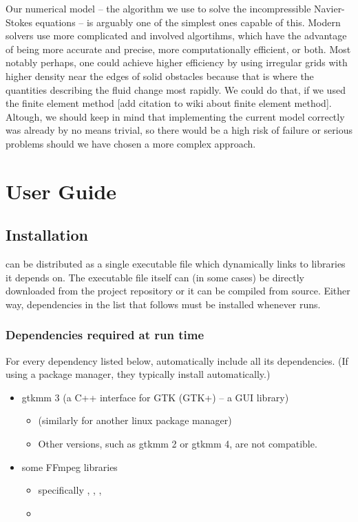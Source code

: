 \documentclass[11pt,a4paper,twoside,openright]{report}
\begin{document}
Our numerical model -- the algorithm we use to solve the incompressible Navier-Stokes equations -- is arguably one of the simplest ones capable of this. Modern solvers use more complicated and involved algortihms, which have the advantage of being more accurate and precise, more computationally efficient, or both. Most notably perhaps, one could achieve higher efficiency by using irregular grids with higher density near the edges of solid obstacles because that is where the quantities describing the fluid change most rapidly. We could do that, if we used the finite element method [add citation to wiki about finite element method]. Altough, we should keep in mind that implementing the current model correctly was already by no means trivial, so there would be a high risk of failure or serious problems should we have chosen a more complex approach.


\chapter{User Guide}

\section{Installation}

\pname{} can be distributed as a single executable file which dynamically links to libraries it depends on. The executable file itself can (in some cases) be directly downloaded from the project repository or it can be compiled from source. Either way, dependencies in the list that follows must be installed whenever \pname{} runs.

\subsection{Dependencies required at run time}\label{sec:runtimedeps}
For every dependency listed below, automatically include all its dependencies. (If using a package manager, they typically install automatically.)
\begin{itemize}
	\item gtkmm 3 (a C++ interface for GTK (GTK+) -- a GUI library)
		\begin{itemize}
			\item \pubinst{} (similarly for another linux package manager)
			\item Other versions, such as gtkmm 2 or gtkmm 4, are not compatible.
		\end{itemize}
	\item some FFmpeg libraries
		\begin{itemize}
			\item specifically , , , 
			\item \pubinst
		\end{itemize}
\end{itemize}
\end{document}
